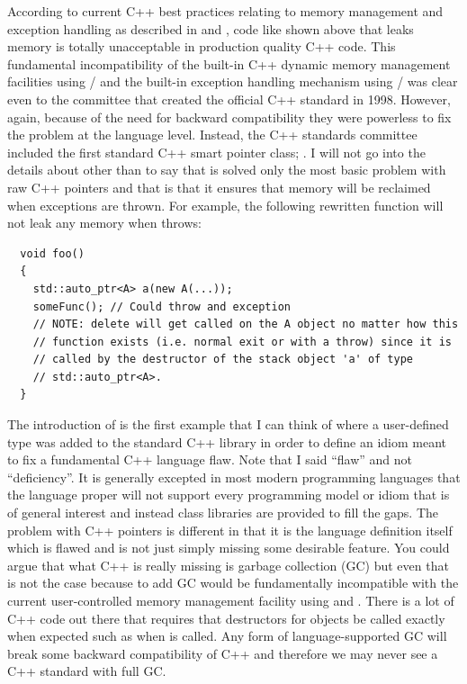 \documentclass[pdf,ps2pdf,11pt]{SANDreport}
\begin{document}
According to current C++ best practices relating to memory management
and exception handling as described in {}\cite[Item
{}\#29]{EffectiveC++ThirdEdition} and {}\cite[Item
{}\#71]{C++CodingStandards05}, code like shown above that leaks memory
is totally unacceptable in production quality C++ code.  This
fundamental incompatibility of the built-in C++ dynamic memory
management facilities using {}/ and the
built-in exception handling mechanism using
{}/ was clear even to the committee that
created the official C++ standard in 1998.  However, again, because of
the need for backward compatibility they were powerless to fix the
problem at the language level.  Instead, the C++ standards committee
included the first standard C++ smart pointer class;
{}.  I will not go into the details about
{} other than to say that is solved only the most
basic problem with raw C++ pointers and that is that it ensures that
memory will be reclaimed when exceptions are thrown.  For example, the
following rewritten function will not leak any memory when
{} throws:

{\small\begin{verbatim}
  void foo()
  {
    std::auto_ptr<A> a(new A(...));
    someFunc(); // Could throw and exception
    // NOTE: delete will get called on the A object no matter how this
    // function exists (i.e. normal exit or with a throw) since it is
    // called by the destructor of the stack object 'a' of type
    // std::auto_ptr<A>. 
  }
\end{verbatim}}

The introduction of {} is the first example
that I can think of where a user-defined type was added to the
standard C++ library in order to define an idiom meant to fix a
fundamental C++ language flaw.  Note that I said ``flaw'' and not
``deficiency''.  It is generally excepted in most modern programming
languages that the language proper will not support every programming
model or idiom that is of general interest and instead class libraries
are provided to fill the gaps.  The problem with C++ pointers is
different in that it is the language definition itself which is flawed
and is not just simply missing some desirable feature.  You could
argue that what C++ is really missing is garbage collection (GC) but
even that is not the case because to add GC would be fundamentally
incompatible with the current user-controlled memory management
facility using {} and {}.  There is a lot
of C++ code out there that requires that destructors for objects be
called exactly when expected such as when {} is called.
Any form of language-supported GC will break some backward
compatibility of C++ and therefore we may never see a C++ standard
with full GC.
\end{document}
